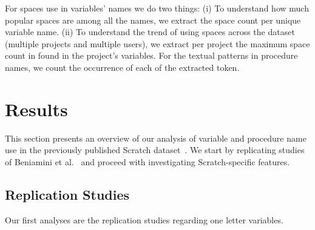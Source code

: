 \documentclass[conference]{IEEEtran}
\begin{document}
For spaces use in variables' names we do two things: (i) To understand how much popular spaces are among all the names, we extract the space count per unique variable name. (ii) To understand the trend of using spaces across the dataset (multiple projects and multiple users), we extract per project the maximum space count in found in the project's variables. For the textual patterns in procedure names, we count the occurrence of each of the extracted token. 

 \section{Results}
This section presents an overview of our analysis of variable and procedure name use in the previously published Scratch dataset~\cite{Aivaloglou2016HowKC}. 
We start by replicating studies of Beniamini et al.~\cite{Beniamini} and proceed with investigating Scratch-specific features.

\subsection{Replication Studies}
Our first analyses are the replication studies regarding one letter variables.
\end{document}

